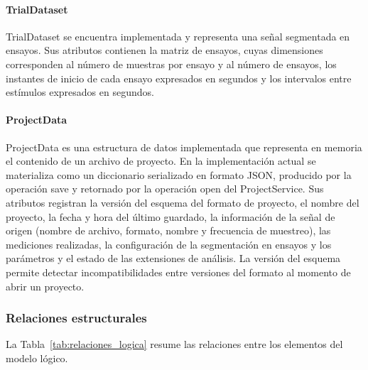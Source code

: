 \documentclass[11pt,a4paper]{article}
\DeclareRobustCommand{\_}{\textunderscore\allowbreak}
\begin{document}
\paragraph{TrialDataset}
TrialDataset se encuentra implementada y representa una señal segmentada en ensayos. Sus atributos contienen la matriz de ensayos, cuyas dimensiones corresponden al número de muestras por ensayo y al número de ensayos, los instantes de inicio de cada ensayo expresados en segundos y los intervalos entre estímulos expresados en segundos.

\paragraph{ProjectData}
ProjectData es una estructura de datos implementada que representa en memoria el contenido de un archivo de proyecto. En la implementación actual se materializa como un diccionario serializado en formato JSON, producido por la operación save y retornado por la operación open del ProjectService. Sus atributos registran la versión del esquema del formato de proyecto, el nombre del proyecto, la fecha y hora del último guardado, la información de la señal de origen (nombre de archivo, formato, nombre y frecuencia de muestreo), las mediciones realizadas, la configuración de la segmentación en ensayos y los parámetros y el estado de las extensiones de análisis. La versión del esquema permite detectar incompatibilidades entre versiones del formato al momento de abrir un proyecto.

\subsubsection{Relaciones estructurales}

La Tabla~\ref{tab:relaciones_logica} resume las relaciones entre los elementos del modelo lógico.
\end{document}
